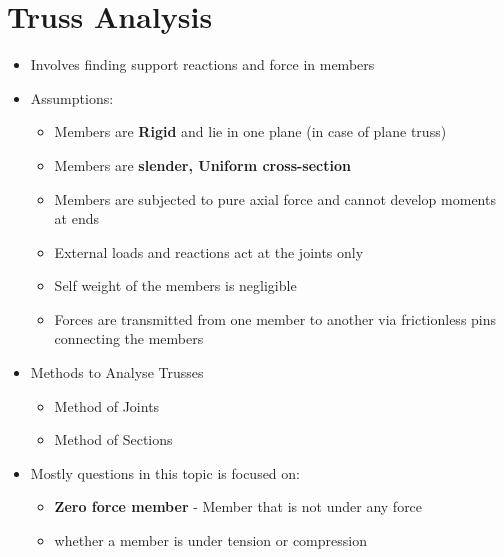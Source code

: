 \documentclass[8pt]{report}
\begin{document}
\section{Truss Analysis}
	\begin{itemize}
		\item Involves finding support reactions and force in members
		\item Assumptions:
			\begin{itemize}
				\item Members are \textbf{Rigid} and lie in one plane (in case of plane truss)
				\item Members are \textbf{slender, Uniform cross-section}
				\item Members are subjected to pure axial force and cannot develop moments at ends
				\item External loads and reactions act at the joints only
				\item Self weight of the members is negligible
				\item Forces are transmitted from one member to another via frictionless pins connecting the members
			\end{itemize}
		\item Methods to Analyse Trusses
			\begin{itemize}
				\item Method of Joints
				\item Method of Sections
			\end{itemize}
		\item Mostly questions in this topic is focused on:
			\begin{itemize}
				\item \textbf{Zero force member} - Member that is not under any force
				\item whether a member is under tension or compression
			\end{itemize}
	\end{itemize}\hrulefill
\end{document}
